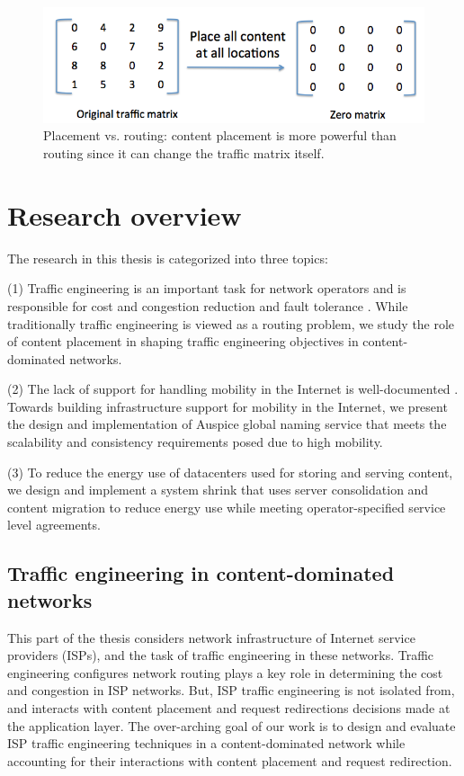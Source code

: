 \begin{figure}
	\centering
	\includegraphics[scale=0.4]{fig/placement-vs-routing.png}
	\caption{Placement vs. routing: content placement is more powerful than routing since it can change the  traffic matrix itself.}
	\label{fig:placement-routing}
\end{figure}


\section{Research overview}

The research in this thesis is categorized into three topics: 

(1) Traffic engineering is an important task for network operators and is responsible for cost and congestion reduction and fault tolerance \cite{rexford,COPE,TEXCP}. While traditionally traffic engineering is viewed as a routing problem, we study the role of content placement in shaping traffic engineering objectives in content-dominated networks.

(2) The lack of support for handling mobility in the Internet is well-documented \cite{HIP,LISP,HAIR,MobilityFirst}. Towards building infrastructure support for mobility in the Internet, we present the design and implementation of Auspice global naming service that meets the scalability and consistency requirements posed due to high mobility.

(3) To reduce the energy use of datacenters used for storing and serving content, we design and implement a system shrink that uses server consolidation and content migration to reduce energy use while meeting operator-specified service level agreements.


\subsection{Traffic engineering in content-dominated networks}

This part of the thesis considers network infrastructure of Internet service providers (ISPs), and the task of traffic engineering in these networks. Traffic engineering configures network routing plays a key role in determining the cost and congestion in ISP networks. But, ISP traffic engineering is not isolated from, and interacts with content placement and request redirections decisions made at the application layer. The over-arching goal of our work is to design and evaluate ISP traffic engineering techniques in a content-dominated network while accounting for their interactions with content placement and request redirection. 

